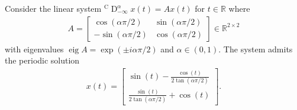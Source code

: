 \documentclass{svproc}
\newcommand{\realnumbers}{\mathbb{R}}
\newcommand{\CderivativeInput}[2]{{}^\mathrm{C}\operatorname{D}_{#2}^{#1}}
\begin{document}
\begin{example}
	Consider the linear system $\CderivativeInput{\alpha}{-\infty}x(t)=Ax(t)$ for $t\in \realnumbers$ where
	\begin{align}
		A=\begin{bmatrix}
			\cos(\alpha \pi/2) & \sin(\alpha \pi /2) \\
			-\sin(\alpha \pi /2) & \cos(\alpha \pi /2) 
		\end{bmatrix} \in \realnumbers^{2\times 2}
	\end{align} with eigenvalues $\operatorname{eig} A = \exp(\pm i\alpha \pi /2)$ and $\alpha \in (0,1)$. The system admits the periodic solution 
	\begin{align}
		x(t) = \begin{bmatrix}
			\sin(t)- \frac{\cos(t)}{2\tan(\alpha\pi/2)}\\
			\frac{\sin(t)}{2\tan(\alpha\pi/2)}+\cos(t)
		\end{bmatrix}.
	\end{align} 
\end{example}
\end{document}
